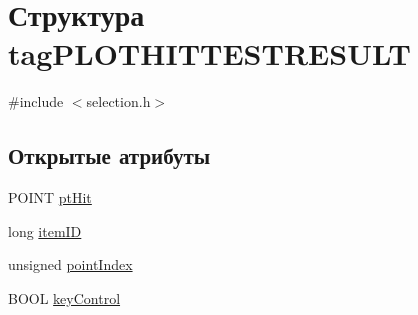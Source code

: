 \hypertarget{structtag_p_l_o_t_h_i_t_t_e_s_t_r_e_s_u_l_t}{\section{Структура tag\-P\-L\-O\-T\-H\-I\-T\-T\-E\-S\-T\-R\-E\-S\-U\-L\-T}
\label{structtag_p_l_o_t_h_i_t_t_e_s_t_r_e_s_u_l_t}
}


{\ttfamily \#include $<$selection.\-h$>$}

\subsection*{Открытые атрибуты}
\begin{DoxyCompactItemize}
\item 
P\-O\-I\-N\-T \hyperlink{structtag_p_l_o_t_h_i_t_t_e_s_t_r_e_s_u_l_t_a7caeb19fd57f871ca7d3ed12edb2bae5}{pt\-Hit}
\item 
long \hyperlink{structtag_p_l_o_t_h_i_t_t_e_s_t_r_e_s_u_l_t_a6ae087b7d34fe801a7936f5be255b685}{item\-I\-D}
\item 
unsigned \hyperlink{structtag_p_l_o_t_h_i_t_t_e_s_t_r_e_s_u_l_t_ad040773163e8d0aa592a19ba32c000f2}{point\-Index}
\item 
B\-O\-O\-L \hyperlink{structtag_p_l_o_t_h_i_t_t_e_s_t_r_e_s_u_l_t_a83edd31f3d1609dffea8659fe57b3815}{key\-Control}
\end{DoxyCompactItemize}



